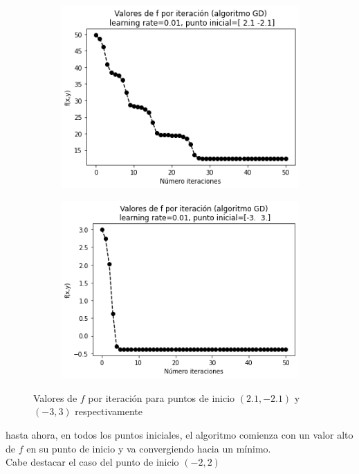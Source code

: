 \documentclass[11pt,a4paper]{article}
\theoremstyle{definition}
\begin{document}
\begin{itemize}
	\begin{figure}[H]
		\centering
		\begin{subfigure}{.5\textwidth}
  		\centering
  		\includegraphics[width=1\textwidth]{images/1_3b_3}
  		\label{fig:sub1}
		\end{subfigure}%
		\begin{subfigure}{.5\textwidth}
  		\centering
  		\includegraphics[width=1\textwidth]{images/1_3b_4}
  		\label{fig:sub2}
		\end{subfigure}
		\caption{Valores de $f$ por iteración para puntos de inicio $(2.1, -2.1)$ y $(-3,3)$ respectivamente}
		\label{fig:test}
	\end{figure}
	 hasta ahora, en todos los puntos iniciales, el algoritmo comienza con un valor alto de $f$ en su punto de inicio y va convergiendo hacia un mínimo.\\
	Cabe destacar el caso del punto de inicio $(-2,2)$
	

\end{itemize}
\end{document}
